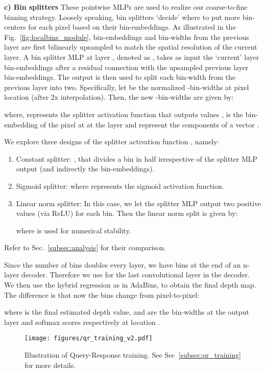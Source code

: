 \documentclass[runningheads]{llncs}
\begin{document}
\textbf{c) Bin splitters} These pointwise MLPs are used to realize our coarse-to-fine binning strategy. Loosely speaking, bin splitters `decide' where to put more bin-centers for each pixel based on their bin-embeddings. As illustrated in the Fig.~\ref{fig:localbins_module}, bin-embeddings and bin-widths from the previous layer are first bilinearly upsampled to match the spatial resolution of the current layer. A bin splitter MLP at layer , denoted as , takes as input the `current' layer bin-embeddings after a residual connection with the upsampled previous layer bin-embeddings. The output is then used to split each bin-width from the previous layer into two. Specifically, let  be the normalized -bin-widths at pixel location  (after 2x interpolation). Then, the new -bin-widths  are given by:



where,  represents the splitter activation function that outputs values ,  is the bin-embedding of the pixel at  at the  layer and  represent the components of a vector .

We explore three designs of the splitter activation function , namely:
\begin{enumerate}
    \item Constant splitter: , that divides a bin in half irrespective of the splitter MLP output (and indirectly the bin-embeddings). 
    \item Sigmoid splitter: where  represents the sigmoid activation function.
    \item Linear norm splitter: In this case, we let the splitter MLP  output two positive values  (via ReLU) for each bin. Then the linear norm split is given by:
    
    where  is used for numerical stability. 
\end{enumerate}
Refer to Sec.~\ref{subsec:analysis} for their comparison.

Since the number of bins doubles every layer, we have  bins at the end of an n-layer decoder. Therefore we use  for the last convolutional layer in the decoder. We then use the hybrid regression as in AdaBins, to obtain the final depth map. The difference is that now the bins change from pixel-to-pixel:




where  is the final estimated depth value,  and  are the bin-widths at the output layer and softmax scores respectively at location .

\label{sec:training}
\begin{figure}[t]
    \centering
    \texttt{[image: figures/qr\_training\_v2.pdf]}
    \caption{Illustration of Query-Response training. See Sec~\ref{subsec:qr_training} for more details.}
    \label{fig:qr_training}
\end{figure}
\end{document}
